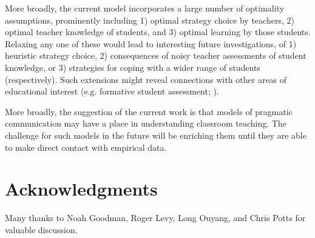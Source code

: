 \documentclass[10pt,letterpaper]{article}
\begin{document}
More broadly, the current model incorporates a large number of optimality assumptions, prominently including 1) optimal strategy choice by teachers, 2) optimal teacher knowledge of students, and 3) optimal learning by those students. Relaxing any one of these would lead to interesting future investigations, of 1) heuristic strategy choice, 2) consequences of noisy teacher assessments of student knowledge, or 3) strategies for coping with a wider range of students (respectively). Such extensions might reveal connections with other areas of educational interest (e.g. formative student assessment; ). 

More broadly, the suggestion of the current work is that models of pragmatic communication may have a place in understanding classroom teaching. The challenge for such models in the future will be enriching them until they are able to make direct contact with empirical data. 

\section{Acknowledgments}

Many thanks to Noah Goodman, Roger Levy, Long Ouyang, and Chris Potts for valuable discussion.



\setlength{\bibleftmargin}{.125in}
\setlength{\bibindent}{-\bibleftmargin}


\end{document}
